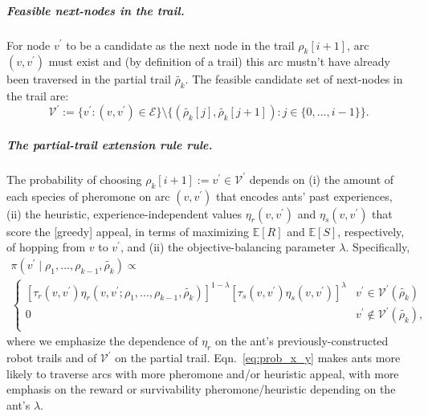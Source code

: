 \documentclass[11pt, oneside]{article}
\begin{document}
\subparagraph{Feasible next-nodes in the trail.}
For node $v^\prime$ to be a candidate as the next node in the trail $\rho_k[i+1]$, arc $(v, v^\prime)$ must exist and (by definition of a trail) this arc mustn't have already been traversed in the partial trail $\tilde{\rho_k}$. 
The feasible candidate set of next-nodes in the trail are:
\begin{equation}
 	\mathcal{V}^\prime := \{ v^\prime : (v, v^\prime ) \in \mathcal{E} \} \setminus \{ (\tilde{\rho_k}[j], \tilde{\rho_k}[j+1]) : j \in \{0,...,i-1\} \}.
\end{equation}


\subparagraph{The partial-trail extension rule rule.}
The probability of choosing $\rho_k[i+1]:=v^\prime \in  \mathcal{V}^\prime$ depends on (i) the amount of each species of pheromone on arc $(v, v^\prime)$ that encodes ants' past experiences, (ii) the heuristic, experience-independent values $\eta_r(v, v^\prime)$ and $\eta_s(v, v^\prime)$ that score the [greedy] appeal, in terms of maximizing $\mathbb{E}[R]$ and $\mathbb{E}[S]$, respectively, of hopping from $v$ to $v^\prime$, and (ii) the objective-balancing parameter $\lambda$. Specifically,
\begin{multline}
	\pi(v^\prime \mid \rho_1, ..., \rho_{k-1}, \tilde{\rho_k}) \propto \\
		\begin{cases}
		 \left[\tau_r(v, v^\prime) \eta_r(v, v^\prime; \rho_1, ..., \rho_{k-1},\tilde{\rho_k}) \right]^{1-\lambda} \left[ \tau_s(v, v^\prime) \eta_s(v, v^\prime) \right]^\lambda & v^\prime \in \mathcal{V}^\prime (\tilde{\rho_k}) \\
		 0 & v^\prime \notin \mathcal{V}^\prime (\tilde{\rho_k}), \\
		 \end{cases}
	 \label{eq:prob_x_y}
\end{multline}
where we emphasize the dependence of $\eta_r$ on the ant's previously-constructed robot trails and of $\mathcal{V}^\prime$ on the partial trail.
Eqn.~\ref{eq:prob_x_y} makes ants more likely to traverse arcs with more pheromone and/or heuristic appeal, with more emphasis on the reward or survivability pheromone/heuristic depending on the ant's $\lambda$.
\end{document}
